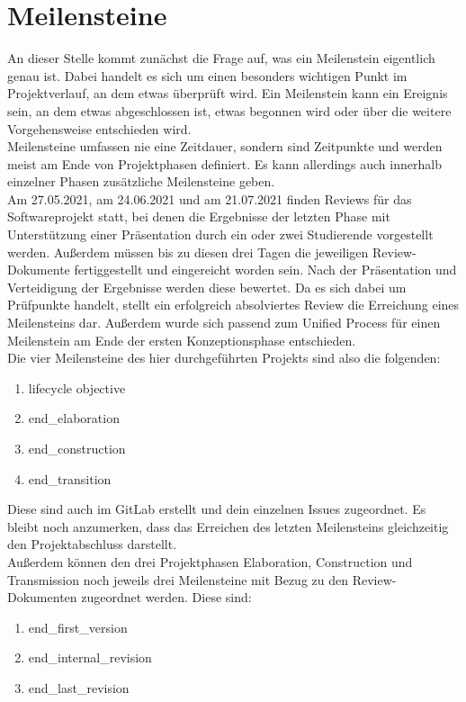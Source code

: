 \documentclass[../review_1.tex]{subfiles}
\begin{document}
\section{Meilensteine}
An dieser Stelle kommt zunächst die Frage auf, was ein Meilenstein eigentlich genau ist. Dabei handelt es sich um einen besonders wichtigen Punkt im Projektverlauf, an dem etwas überprüft wird. Ein Meilenstein kann ein Ereignis sein, an dem etwas abgeschlossen ist, etwas begonnen wird oder über die weitere Vorgehensweise entschieden wird.\\
Meilensteine umfassen nie eine Zeitdauer, sondern sind Zeitpunkte und werden meist am Ende von Projektphasen definiert. Es kann allerdings auch innerhalb einzelner Phasen zusätzliche Meilensteine geben.\\
Am 27.05.2021, am 24.06.2021 und am 21.07.2021 finden Reviews für das Softwareprojekt statt, bei denen die Ergebnisse der letzten Phase mit Unterstützung einer Präsentation durch ein oder zwei Studierende vorgestellt werden. Außerdem müssen bis zu diesen drei Tagen die jeweiligen Review-Dokumente fertiggestellt und eingereicht worden sein. Nach der Präsentation und Verteidigung der Ergebnisse werden diese bewertet. Da es sich dabei um Prüfpunkte handelt, stellt ein erfolgreich absolviertes Review die Erreichung eines Meilensteins dar. Außerdem wurde sich passend zum Unified Process für einen Meilenstein am Ende der ersten Konzeptionsphase entschieden.\\
Die vier Meilensteine des hier durchgeführten Projekts sind also die folgenden:
\begin{enumerate}
    \item lifecycle objective
    \item end\_elaboration
    \item end\_construction
    \item end\_transition
\end{enumerate}
Diese sind auch im GitLab erstellt und dein einzelnen Issues zugeordnet. Es bleibt noch anzumerken, dass das Erreichen des letzten Meilensteins gleichzeitig den Projektabschluss darstellt.\\
Außerdem können den drei Projektphasen Elaboration, Construction und Transmission noch jeweils drei Meilensteine mit Bezug zu den Review-Dokumenten zugeordnet werden. Diese sind:
\begin{enumerate}
    \item end\_first\_version
    \item end\_internal\_revision
    \item end\_last\_revision
\end{enumerate}
\end{document}
